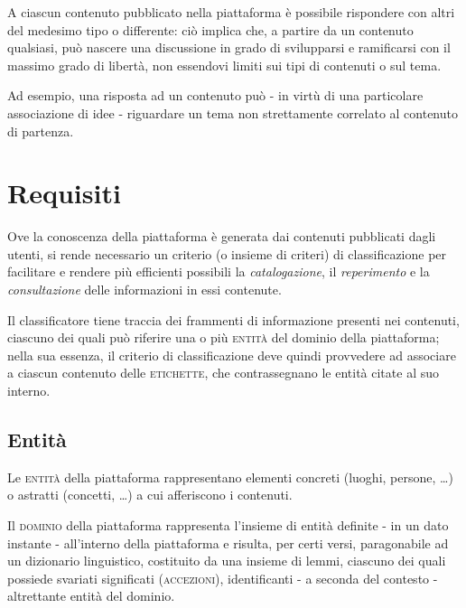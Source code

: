 \documentclass[10pt,a4paper,headinclude,footinclude,hidelinks]{scrreprt} %
\begin{document}

	A ciascun contenuto pubblicato nella piattaforma è possibile rispondere con altri del medesimo tipo o differente: ciò implica che, a partire da un contenuto qualsiasi, può nascere una discussione in grado di svilupparsi e ramificarsi con il massimo grado di libertà, non essendovi limiti sui tipi di contenuti o sul tema.

	Ad esempio, una risposta ad un contenuto può - in virtù di una particolare associazione di idee - riguardare un tema non strettamente correlato al contenuto di partenza.
	
	\chapter{Requisiti}
	\label{ch:stage:req}
	Ove la conoscenza della piattaforma è generata dai contenuti pubblicati dagli utenti, si rende necessario un criterio (o insieme di criteri) di classificazione per facilitare e rendere più efficienti possibili la \textit{catalogazione}, il \textit{reperimento} e la \textit{consultazione} delle informazioni in essi contenute.

	Il classificatore tiene traccia dei frammenti di informazione presenti nei contenuti, ciascuno dei quali può riferire una o più \textsc{entità} del dominio della piattaforma; nella sua essenza, il criterio di classificazione deve quindi provvedere ad associare a ciascun contenuto delle \textsc{etichette}, che contrassegnano le entità citate al suo interno.

	\section{Entit\`a}
	\label{sec:stage:req:entità}
	Le \textsc{entità} della piattaforma rappresentano elementi concreti (luoghi, persone, \ldots) o astratti (concetti, \ldots) a cui afferiscono i contenuti.

	Il \textsc{dominio} della piattaforma rappresenta l'insieme di entità definite - in un dato instante - all'interno della piattaforma e risulta, per certi versi, paragonabile ad un dizionario linguistico, costituito da una insieme di lemmi, ciascuno dei quali possiede svariati significati (\textsc{accezioni}), identificanti - a seconda del contesto - altrettante entità del dominio.
\end{document}
